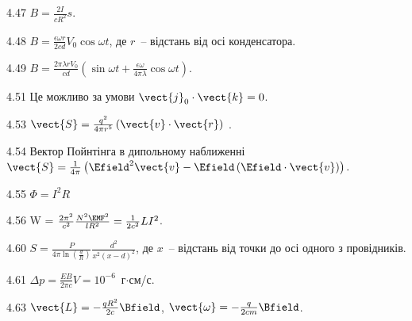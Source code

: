 \begin{Solution}{4.{47}}
	$B = \frac{2I}{cR^2}s$.
\end{Solution}
\begin{Solution}{4.{48}}
	$B = \frac{\epsilon\omega r}{2cd}V_0\cos\omega t$, де $r$~-- відстань від осі конденсатора.
\end{Solution}
\begin{Solution}{4.{49}}
	$B = \frac{2\pi\lambda r V_0}{cd}\left( \sin\omega t + \frac{\epsilon \omega}{4\pi\lambda}\cos\omega t\right) $.
\end{Solution}
\begin{Solution}{4.{51}}
	Це можливо за умови $\vect{j}_0\cdot\vect{k} = 0$.
\end{Solution}
\begin{Solution}{4.{53}}
	$\vect{S} = \frac{q^2}{4\pi r^5} \left( \vect{v} \cdot \vect{r}\right)$ .
\end{Solution}
\begin{Solution}{4.{54}}
	Вектор Пойнтінга в дипольному наближенні $\vect{S} = \frac{1}{4\pi} \left( \Efield^2 \vect{v} - \Efield\left(\Efield\cdot\vect{v} \right) \right) $.
\end{Solution}
\begin{Solution}{4.{55}}
	$\Phi = I^2R$
\end{Solution}
\begin{Solution}{4.{56}}
	W = $\frac{2\pi^2}{c^2} \frac{N^2\EMF^2}{lR^2} = \frac{1}{2c^2} LI^2$.
\end{Solution}
\begin{Solution}{4.{60}}
	$S  = \frac{P}{4\pi\ln\left( \frac{d}{R} \right) } \frac{d^2}{x^2\left( x - d\right)^2 }$, де $x$~-- відстань від точки до осі одного з провідників.
\end{Solution}
\begin{Solution}{4.{61}}
	$\Delta p = \frac{EB}{2\pi c}V = 10^{-6}$~г$\cdot$см/с.
\end{Solution}
\begin{Solution}{4.{63}}
    $ \vect{L} =  -\frac{q R^2}{2c}\Bfield $, $ \vect{\omega} = -\frac{q}{2c m}\Bfield $.
\end{Solution}
